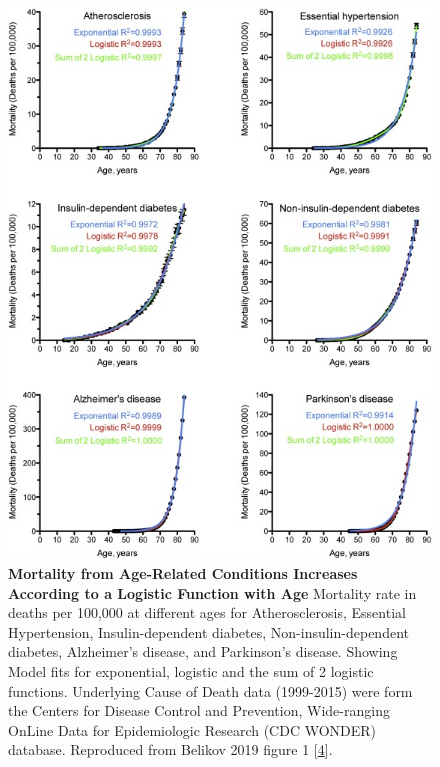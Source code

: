 \documentclass[
]{book}
\begin{document}
\begin{figure}

{\centering \includegraphics[width=0.8\linewidth]{figs/Belikov2019_fig1} 

}

\caption{\textbf{Mortality from Age-Related Conditions Increases According to a Logistic Function with Age} Mortality rate in deaths per 100,000 at different ages for Atherosclerosis, Essential Hypertension, Insulin-dependent diabetes, Non-insulin-dependent diabetes, Alzheimer's disease, and Parkinson's disease. Showing Model fits for exponential, logistic and the sum of 2 logistic functions. Underlying Cause of Death data (1999-2015) were form the Centers for Disease Control and Prevention, Wide-ranging OnLine Data for Epidemiologic Research (CDC WONDER) database. Reproduced from Belikov 2019 figure 1 {[}\protect\hyperlink{ref-Belikov2019}{4}{]}.}\label{fig:Belikov2019-fig1}
\end{figure}
\end{document}
